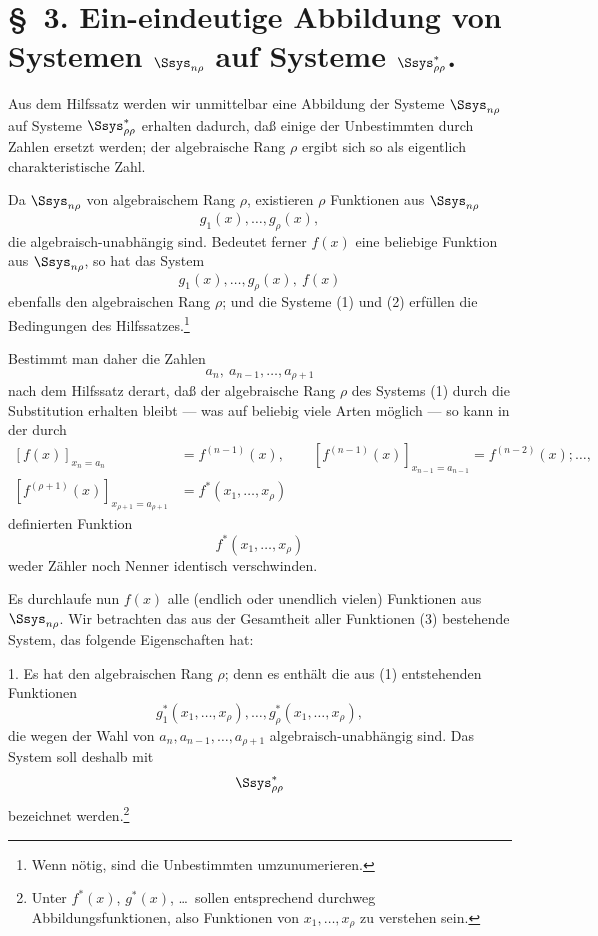 \documentclass[11pt]{article}
\begin{document}
\section*{\S\ 3. Ein-eindeutige Abbildung von Systemen $\Ssys_{n\rho}$ auf Systeme $\Ssys^*_{\rho\rho}$.}

Aus dem Hilfssatz werden wir unmittelbar eine Abbildung der Systeme $\Ssys_{n\rho}$ auf Systeme $\Ssys^*_{\rho\rho}$ erhalten dadurch, daß einige der Unbestimmten durch Zahlen ersetzt werden; der algebraische Rang $\rho$ ergibt sich so als eigentlich charakteristische Zahl.

Da $\Ssys_{n\rho}$ von algebraischem Rang $\rho$, existieren $\rho$ Funktionen aus $\Ssys_{n\rho}$
\begin{equation}
  g_1(x),\ldots,g_\rho(x),
\tag{1}
\end{equation}
die algebraisch-unabhängig sind. Bedeutet ferner $f(x)$ eine beliebige Funktion aus $\Ssys_{n\rho}$, so hat das System
\begin{equation}
  g_1(x),\ldots,g_\rho(x),\ f(x)
\tag{2}
\end{equation}
ebenfalls den algebraischen Rang $\rho$; und die Systeme (1) und (2) erfüllen die Bedingungen des Hilfssatzes.\footnote{Wenn nötig, sind die Unbestimmten umzunumerieren.}

Bestimmt man daher die Zahlen
\[
  a_n,
\ a_{n-1},\ldots,a_{\rho+1}
\]
nach dem Hilfssatz derart, daß der algebraische Rang $\rho$ des Systems (1) durch die Substitution erhalten bleibt --- was auf beliebig viele Arten möglich --- so kann in der durch
\[
\begin{aligned}
 [f(x)]_{x_n=a_n}&=f^{(n-1)}(x),\qquad
 [f^{(n-1)}(x)]_{x_{n-1}=a_{n-1}}=f^{(n-2)}(x);\ldots,\\
 [f^{(\rho+1)}(x)]_{x_{\rho+1}=a_{\rho+1}}&=f^*(x_1,
\ldots,x_\rho)
\end{aligned}
\]
definierten Funktion
\begin{equation}
  f^*(x_1,\ldots,x_\rho)
\tag{3}
\end{equation}
weder Zähler noch Nenner identisch verschwinden.

Es durchlaufe nun $f(x)$ alle (endlich oder unendlich vielen) Funktionen aus $\Ssys_{n\rho}$. Wir betrachten das aus der Gesamtheit aller Funktionen (3) bestehende System, das folgende Eigenschaften hat:

1. Es hat den algebraischen Rang $\rho$; denn es enthält die aus (1) entstehenden Funktionen
\[
  g_1^*(x_1,
\ldots,x_\rho),\ldots,g_\rho^*(x_1,\ldots,x_\rho),
\]
die wegen der Wahl von $a_n,a_{n-1},\ldots,a_{\rho+1}$ algebraisch-unabhängig sind. Das System soll deshalb mit
\[
  \Ssys^*_{\rho\rho}
\]
bezeichnet werden.\footnote{Unter $f^*(x)$, $g^*(x)$, \ldots\ sollen entsprechend durchweg Abbildungsfunktionen, also Funktionen von $x_1,
\ldots,x_\rho$ zu verstehen sein.}
\end{document}
